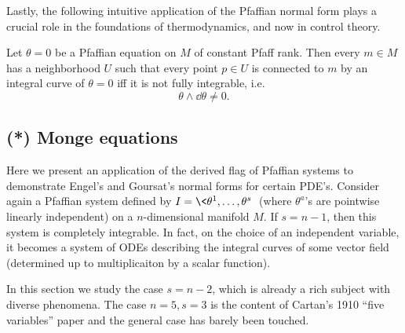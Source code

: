 Lastly, the following intuitive application of the Pfaffian normal form plays a crucial role in the foundations of thermodynamics, and now in control theory.

\begin{thm}[Caratheodory]
    Let $\theta=0$ be a Pfaffian equation on $M$ of constant Pfaff rank. Then every $m\in M$ has a neighborhood $U$ such that every point $p\in U$ is connected to $m$ by an integral curve of $\theta=0$ iff it is not fully integrable, i.e.\
    \[\theta\wedge\dd\theta\neq 0.\]
\end{thm}






\subsection{(*) Monge equations}

Here we present an application of the derived flag of Pfaffian systems to demonstrate Engel's and Goursat's normal forms for certain PDE's. Consider again a Pfaffian system defined by $I=\<\theta^1,\ldots,\theta^s\>$ (where $\theta^a$'s are pointwise linearly independent) on a $n$-dimensional manifold $M$. If $s=n-1$, then this system is completely integrable. In fact, on the choice of an independent variable, it becomes a system of ODEs describing the integral curves of some vector field (determined up to multiplicaiton by a scalar function).

In this section we study the case $s=n-2$, which is already a rich subject with diverse phenomena. The case $n=5,s=3$ is the content of Cartan's 1910 ``five variables'' paper and the general case has barely been touched.

